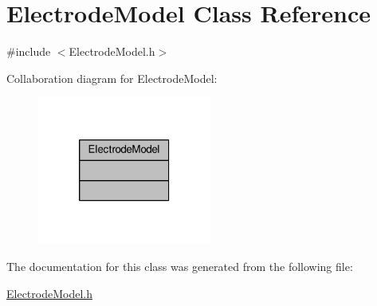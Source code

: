 \hypertarget{classElectrodeModel}{\section{Electrode\-Model Class Reference}
\label{classElectrodeModel}
}


{\ttfamily \#include $<$Electrode\-Model.\-h$>$}



Collaboration diagram for Electrode\-Model\-:
\nopagebreak
\begin{figure}[H]
\begin{center}
\leavevmode
\includegraphics[width=162pt]{classElectrodeModel__coll__graph}
\end{center}
\end{figure}


The documentation for this class was generated from the following file\-:\begin{DoxyCompactItemize}
\item 
\hyperlink{ElectrodeModel_8h}{Electrode\-Model.\-h}\end{DoxyCompactItemize}
